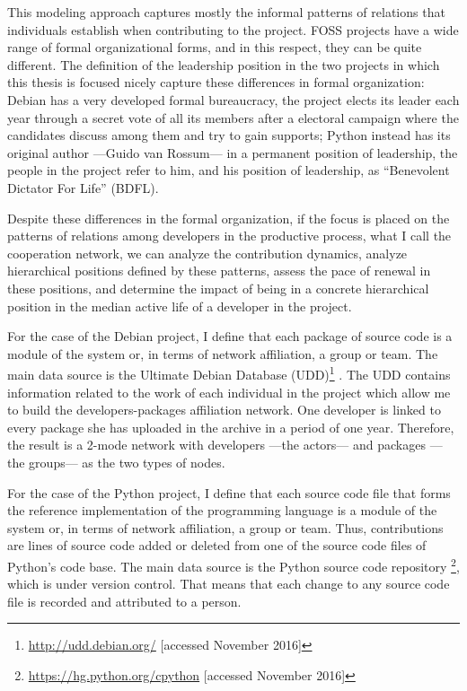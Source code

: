 This modeling approach captures mostly the informal patterns of relations that individuals establish when contributing to the project. FOSS projects have a wide range of formal organizational forms, and in this respect, they can be quite different. The definition of the leadership position in the two projects in which this thesis is focused nicely capture these differences in formal organization: Debian has a very developed formal bureaucracy, the project elects its leader each year through a secret vote of all its members after a electoral campaign where the candidates discuss among them and try to gain supports; Python instead has its original author ---Guido van Rossum--- in a permanent position of leadership, the people in the project refer to him, and his position of leadership, as ``Benevolent Dictator For Life'' (BDFL).

Despite these differences in the formal organization, if the focus is placed on the patterns of relations among developers in the productive process, what I call the cooperation network, we can analyze the contribution dynamics, analyze hierarchical positions defined by these patterns, assess the pace of renewal in these positions, and determine the impact of being in a concrete hierarchical position in the median active life of a developer in the project.

For the case of the Debian project, I define that each package of source code is a module of the system or, in terms of network affiliation, a group or team. The main data source is the Ultimate Debian Database (UDD)\footnote{\href{http://udd.debian.org/}{http://udd.debian.org/} [accessed November 2016]} \citep{udd:2010}. The UDD contains information related to the work of each individual in the project which allow me to build the developers-packages affiliation network. One developer is linked to every package she has uploaded in the archive in a period of one year. Therefore, the result is a 2-mode network with developers ---the actors--- and packages ---the groups--- as the two types of nodes.

For the case of the Python project, I define that each source code file that forms the reference implementation of the programming language is a module of the system or, in terms of network affiliation, a group or team. Thus, contributions are lines of source code added or deleted from one of the source code files of Python's code base. The main data source is the Python source code repository \footnote{\href{https://hg.python.org/cpython}{https://hg.python.org/cpython} [accessed November 2016]}, which is under version control. That means that each change to any source code file is recorded and attributed to a person.

